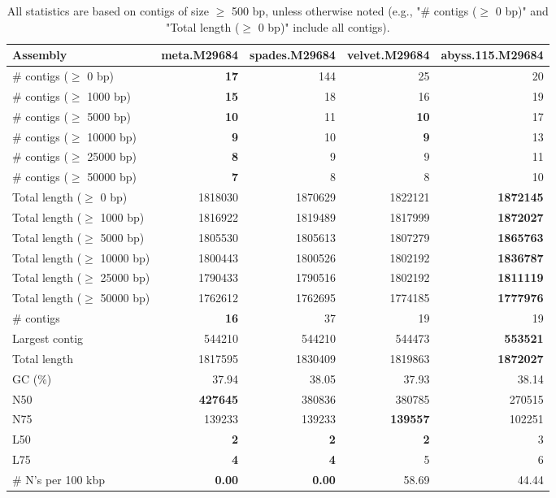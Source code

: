 \documentclass[12pt,a4paper]{article}
\begin{document}
\begin{table}[ht]
\begin{center}
\caption{All statistics are based on contigs of size $\geq$ 500 bp, unless otherwise noted (e.g., "\# contigs ($\geq$ 0 bp)" and "Total length ($\geq$ 0 bp)" include all contigs).}
\begin{tabular}{|l*{4}{|r}|}
\hline
Assembly & meta.M29684 & spades.M29684 & velvet.M29684 & abyss.115.M29684 \\ \hline
\# contigs ($\geq$ 0 bp) & {\bf 17} & 144 & 25 & 20 \\ \hline
\# contigs ($\geq$ 1000 bp) & {\bf 15} & 18 & 16 & 19 \\ \hline
\# contigs ($\geq$ 5000 bp) & {\bf 10} & 11 & {\bf 10} & 17 \\ \hline
\# contigs ($\geq$ 10000 bp) & {\bf 9} & 10 & {\bf 9} & 13 \\ \hline
\# contigs ($\geq$ 25000 bp) & {\bf 8} & 9 & 9 & 11 \\ \hline
\# contigs ($\geq$ 50000 bp) & {\bf 7} & 8 & 8 & 10 \\ \hline
Total length ($\geq$ 0 bp) & 1818030 & 1870629 & 1822121 & {\bf 1872145} \\ \hline
Total length ($\geq$ 1000 bp) & 1816922 & 1819489 & 1817999 & {\bf 1872027} \\ \hline
Total length ($\geq$ 5000 bp) & 1805530 & 1805613 & 1807279 & {\bf 1865763} \\ \hline
Total length ($\geq$ 10000 bp) & 1800443 & 1800526 & 1802192 & {\bf 1836787} \\ \hline
Total length ($\geq$ 25000 bp) & 1790433 & 1790516 & 1802192 & {\bf 1811119} \\ \hline
Total length ($\geq$ 50000 bp) & 1762612 & 1762695 & 1774185 & {\bf 1777976} \\ \hline
\# contigs & {\bf 16} & 37 & 19 & 19 \\ \hline
Largest contig & 544210 & 544210 & 544473 & {\bf 553521} \\ \hline
Total length & 1817595 & 1830409 & 1819863 & {\bf 1872027} \\ \hline
GC (\%) & 37.94 & 38.05 & 37.93 & 38.14 \\ \hline
N50 & {\bf 427645} & 380836 & 380785 & 270515 \\ \hline
N75 & 139233 & 139233 & {\bf 139557} & 102251 \\ \hline
L50 & {\bf 2} & {\bf 2} & {\bf 2} & 3 \\ \hline
L75 & {\bf 4} & {\bf 4} & 5 & 6 \\ \hline
\# N's per 100 kbp & {\bf 0.00} & {\bf 0.00} & 58.69 & 44.44 \\ \hline
\end{tabular}
\end{center}
\end{table}
\end{document}
